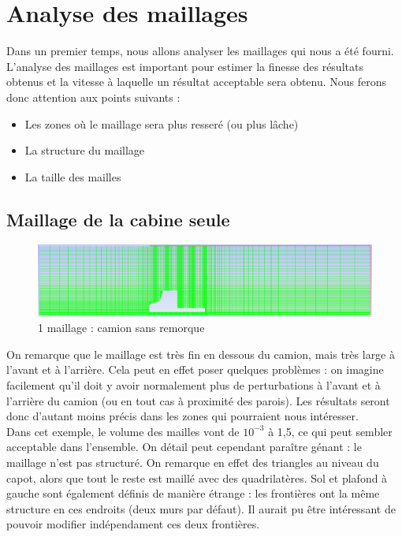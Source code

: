\section{Analyse des maillages}
Dans un premier temps, nous allons analyser les maillages qui nous a été fourni. L'analyse des maillages est important pour estimer la finesse des résultats obtenus et la vitesse à laquelle un résultat acceptable sera obtenu. Nous ferons donc attention aux points suivants :
\begin{itemize}
	\item Les zones où le maillage sera plus resseré (ou plus lâche)
	\item La structure du maillage
	\item La taille des mailles
\end{itemize}

\subsection{Maillage de la cabine seule}
\begin{figure}[!h]
\centering
\includegraphics[scale=0.4]{images/camion_cabine_1.png}
\caption{1\ier{} maillage : camion sans remorque}
\end{figure}
On remarque que le maillage est très fin en dessous du camion, mais très large à l'avant et à l'arrière. Cela peut en effet poser quelques problèmes : on imagine facilement qu'il doit y avoir normalement plus de perturbations à l'avant et à l'arrière du camion (ou en tout cas à proximité des parois). Les résultats seront donc d'autant moins précis dans les zones qui pourraient nous intéresser.\\
Dans cet exemple, le volume des mailles vont de $10^{-3}$ à 1,5, ce qui peut sembler acceptable dans l'ensemble. On détail peut cependant paraître génant : le maillage n'est pas structuré. On remarque en effet des triangles au niveau du capot, alors que tout le reste est maillé avec des quadrilatères. Sol et plafond à gauche sont également définis de manière étrange : les frontières ont la même structure en ces endroits (deux murs par défaut). Il aurait pu être intéressant de pouvoir modifier indépendament ces deux frontières.

